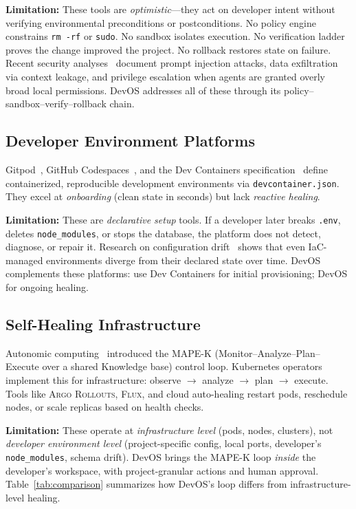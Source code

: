 \documentclass[conference,10pt,caption=false]{IEEEtran}
\begin{document}
\textbf{Limitation:} These tools are \textit{optimistic}---they act on developer intent without verifying environmental preconditions or postconditions. No policy engine constrains \texttt{rm -rf} or \texttt{sudo}. No sandbox isolates execution. No verification ladder proves the change improved the project. No rollback restores state on failure. Recent security analyses~\cite{llm-code-security, prompt-injection} document prompt injection attacks, data exfiltration via context leakage, and privilege escalation when agents are granted overly broad local permissions. DevOS addresses all of these through its policy--sandbox--verify--rollback chain.

\subsection{Developer Environment Platforms}
\label{sec:dev-platforms}
Gitpod~\cite{gitpod}, GitHub Codespaces~\cite{codespaces}, and the Dev Containers specification~\cite{devcontainers2026} define containerized, reproducible development environments via \texttt{devcontainer.json}. They excel at \textit{onboarding} (clean state in seconds) but lack \textit{reactive healing}.

\textbf{Limitation:} These are \textit{declarative setup} tools. If a developer later breaks \texttt{.env}, deletes \texttt{node\_modules}, or stops the database, the platform does not detect, diagnose, or repair it. Research on configuration drift~\cite{config-drift} shows that even IaC-managed environments diverge from their declared state over time. DevOS complements these platforms: use Dev Containers for initial provisioning; DevOS for ongoing healing.

\subsection{Self-Healing Infrastructure}
\label{sec:self-healing-infra}
Autonomic computing~\cite{autonomic2001} introduced the MAPE-K (Monitor--Analyze--Plan--Execute over a shared Knowledge base) control loop. Kubernetes operators~\cite{k8s-operators} implement this for infrastructure: observe $\to$ analyze $\to$ plan $\to$ execute. Tools like \textsc{Argo Rollouts}, \textsc{Flux}, and cloud auto-healing restart pods, reschedule nodes, or scale replicas based on health checks.

\textbf{Limitation:} These operate at \textit{infrastructure level} (pods, nodes, clusters), not \textit{developer environment level} (project-specific config, local ports, developer's \texttt{node\_modules}, schema drift). DevOS brings the MAPE-K loop \textit{inside} the developer's workspace, with project-granular actions and human approval. Table~\ref{tab:comparison} summarizes how DevOS's loop differs from infrastructure-level healing.
\end{document}
